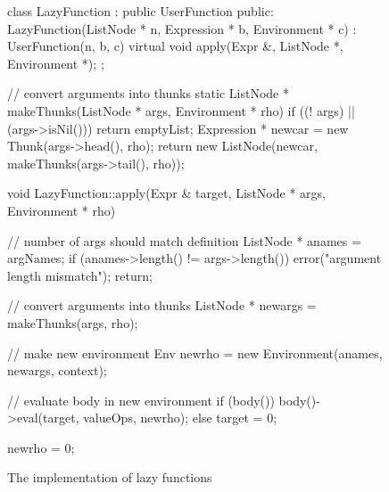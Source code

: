 \begin{figure}
\begin{cprog}
class LazyFunction : public UserFunction {
public:
	LazyFunction(ListNode * n, Expression * b, Environment * c)
		: UserFunction(n, b, c) {}
	virtual void apply(Expr &, ListNode *, Environment *);
};

//	convert arguments into thunks
static ListNode * makeThunks(ListNode * args, Environment * rho)
{
	if ((! args) || (args->isNil()))
		return emptyList;
	Expression * newcar = new Thunk(args->head(), rho);
	return new ListNode(newcar, makeThunks(args->tail(), rho));
}

void LazyFunction::apply(Expr & target, ListNode * args, Environment * rho)
{
	// number of args should match definition
	ListNode * anames = argNames;
	if (anames->length() != args->length()) {
		error("argument length mismatch");
		return;
		}

	// convert arguments into thunks
	ListNode * newargs = makeThunks(args, rho);

	// make new environment
	Env newrho = new Environment(anames, newargs, context);

	// evaluate body in new environment
	if (body())
		body()->eval(target, valueOps, newrho);
	else
		target = 0;

	newrho = 0;
}
\end{cprog}
\caption{The implementation of lazy functions}\label{lazyfunction}
\end{figure}
